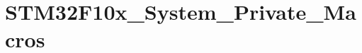 \hypertarget{group___s_t_m32_f10x___system___private___macros}{}\section{S\+T\+M32\+F10x\+\_\+\+System\+\_\+\+Private\+\_\+\+Macros}
\label{group___s_t_m32_f10x___system___private___macros}
